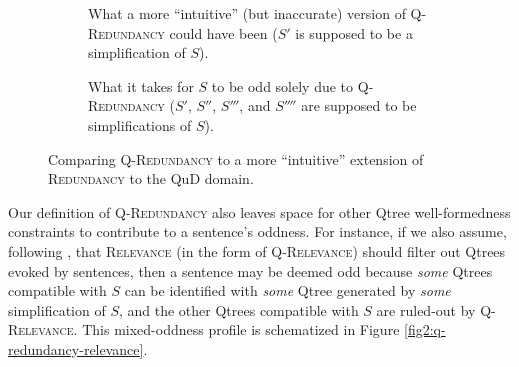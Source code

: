 \begin{figure}[H]
	\centering
	\begin{subfigure}[b]{.3\linewidth}
		\centering
	\caption{What a more ``intuitive'' (but inaccurate) version of \textsc{Q-Redundancy} could have been ($S'$ is supposed to be a simplification of $S$).}\label{fig2:redundancy-intuitive-extension}
	\end{subfigure}\hfill
	\begin{subfigure}[b]{.65\linewidth}
		\centering
	\caption{What it takes for $S$ to be odd solely due to \textsc{Q-Redundancy} ($S'$, $S''$, $S'''$, and $S''''$ are supposed to be simplifications of $S$).}\label{fig2:q-redundancy}
	\end{subfigure}
	\caption{Comparing \textsc{Q-Redundancy} to a more ``intuitive'' extension of \textsc{Redundancy} to the QuD domain.}
\end{figure}

Our definition of \textsc{Q-Redundancy} also leaves space for other Qtree well-formedness constraints to contribute to a sentence's oddness. For instance, if we also assume, following \citet{HenotMortier2024a}, that \textsc{Relevance} (in the form of \textsc{Q-Relevance}) should filter out Qtrees evoked by sentences, then a sentence may be deemed odd because \textit{some} Qtrees compatible with $S$ can be identified with \textit{some} Qtree generated by \textit{some} simplification of $S$, and the other Qtrees compatible with $S$ are ruled-out by \textsc{Q-Relevance}. This mixed-oddness profile is schematized in Figure \ref{fig2:q-redundancy-relevance}.



